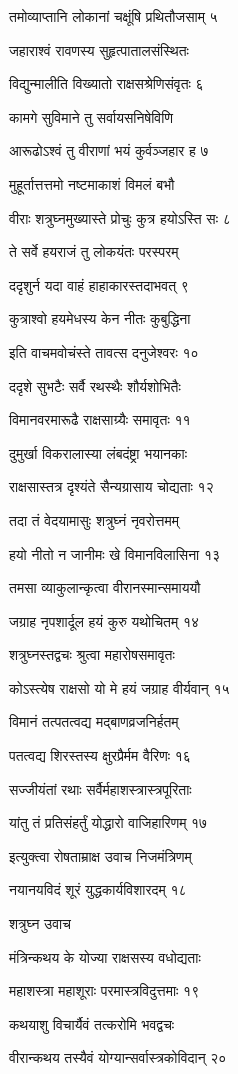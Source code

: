 तमोव्याप्तानि लोकानां चक्षूंषि प्रथितौजसाम् ५

जहाराश्वं रावणस्य सुहृत्पातालसंस्थितः

विद्युन्मालीति विख्यातो राक्षसश्रेणिसंवृतः ६

कामगे सुविमाने तु सर्वायसनिषेविणि

आरूढोऽश्वं तु वीराणां भयं कुर्वञ्जहार ह ७

मुहूर्तात्तत्तमो नष्टमाकाशं विमलं बभौ

वीराः शत्रुघ्नमुख्यास्ते प्रोचुः कुत्र हयोऽस्ति सः ८

ते सर्वे हयराजं तु लोकयंतः परस्परम्

ददृशुर्न यदा वाहं हाहाकारस्तदाभवत् ९

कुत्राश्वो हयमेधस्य केन नीतः कुबुद्धिना

इति वाचमवोचंस्ते तावत्स दनुजेश्वरः १०

ददृशे सुभटैः सर्वै रथस्थैः शौर्यशोभितैः

विमानवरमारूढै राक्षसाग्र्यैः समावृतः ११

दुमुर्खा विकरालास्या लंबदंष्ट्रा भयानकाः

राक्षसास्तत्र दृश्यंते सैन्यग्रासाय चोद्यताः १२

तदा तं वेदयामासुः शत्रुघ्नं नृवरोत्तमम्

हयो नीतो न जानीमः खे विमानविलासिना १३

तमसा व्याकुलान्कृत्वा वीरानस्मान्समाययौ

जग्राह नृपशार्दूल हयं कुरु यथोचितम् १४

शत्रुघ्नस्तद्वचः श्रुत्वा महारोषसमावृतः

कोऽस्त्येष राक्षसो यो मे हयं जग्राह वीर्यवान् १५

विमानं तत्पतत्वद्य मद्बाणव्रजनिर्हतम्

पतत्वद्य शिरस्तस्य क्षुरप्रैर्मम वैरिणः १६

सज्जीयंतां रथाः सर्वैर्महाशस्त्रास्त्रपूरिताः

यांतु तं प्रतिसंहर्तुं योद्धारो वाजिहारिणम् १७

इत्युक्त्वा रोषताम्राक्ष उवाच निजमंत्रिणम्

नयानयविदं शूरं युद्धकार्यविशारदम् १८

शत्रुघ्न उवाच

मंत्रिन्कथय के योज्या राक्षसस्य वधोद्यताः

महाशस्त्रा महाशूराः परमास्त्रविदुत्तमाः १९

कथयाशु विचार्यैवं तत्करोमि भवद्वचः

वीरान्कथय तस्यैवं योग्यान्सर्वास्त्रकोविदान् २०

